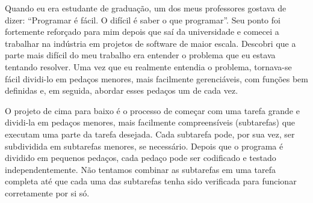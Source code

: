 \documentclass[11pt,a4paper]{book}
\begin{document}
	Quando eu era estudante de graduação, um dos meus professores gostava de dizer: ``Programar é fácil. O difícil é saber o que programar''. Seu ponto foi fortemente reforçado para mim depois que saí da universidade e comecei a trabalhar na indústria em projetos de software de maior escala. Descobri que a parte mais difícil do meu trabalho era entender o problema que eu estava tentando resolver. Uma vez que eu realmente entendia o problema, tornava-se fácil dividi-lo em pedaços menores, mais facilmente gerenciáveis, com funções bem definidas e, em seguida, abordar esses pedaços um de cada vez.
	
	O projeto de cima para baixo é o processo de começar com uma tarefa grande e dividi-la em pedaços menores, mais facilmente compreensíveis (subtarefas) que executam uma parte da tarefa desejada. Cada subtarefa pode, por sua vez, ser subdividida em subtarefas menores, se necessário. Depois que o programa é dividido em pequenos pedaços, cada pedaço pode ser codificado e testado independentemente. Não tentamos combinar as subtarefas em uma tarefa completa até que cada uma das subtarefas tenha sido verificada para funcionar corretamente por si só.
	
\end{document}
